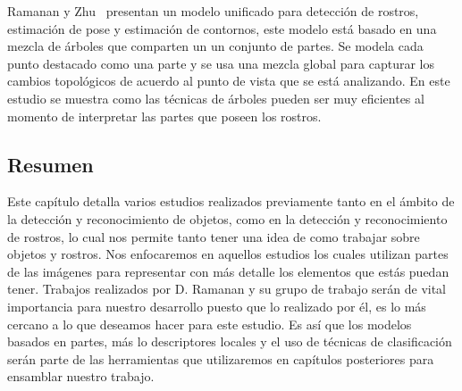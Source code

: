 Ramanan y Zhu~\cite{Zhu2012} presentan un modelo unificado para detección de rostros, estimación de pose y estimación de contornos, este modelo está basado en una mezcla de árboles que comparten un un conjunto de partes. Se modela cada punto destacado como una parte y se usa una mezcla global para capturar los cambios topológicos de acuerdo al punto de vista que se está analizando. En este estudio se muestra como las técnicas de árboles pueden ser muy eficientes al momento de interpretar las partes que poseen los rostros.

\subsection{Resumen}
Este capítulo detalla varios estudios realizados previamente tanto en el ámbito de la detección y reconocimiento de objetos, como en la detección y reconocimiento de rostros, lo cual nos permite tanto tener una idea de como trabajar sobre objetos y rostros. Nos enfocaremos en aquellos estudios los cuales utilizan partes de las imágenes para representar con más detalle los elementos que estás puedan tener. Trabajos realizados por D. Ramanan y su grupo de trabajo serán de vital importancia para nuestro desarrollo puesto que lo realizado por él, es lo más cercano a lo que deseamos hacer para este estudio. Es así que los modelos basados en partes, más lo descriptores locales y el uso de técnicas de clasificación serán parte de las herramientas que utilizaremos en capítulos posteriores para ensamblar nuestro trabajo.